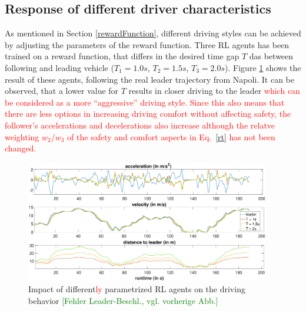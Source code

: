 \documentclass[review]{elsarticle}
\providecommand{\red}[1]{\textcolor{red}{#1}}
\providecommand{\green}[1]{\textcolor{green}{#1}}
\providecommand{\martin}[1]{\red{#1}} %
\providecommand{\martinc}[1]{\green{[#1]}} %
\providecommand{\3}{{\ss}}
\begin{document}
\subsection{Response of different driver characteristics}
\label{sec:differentT}

As mentioned in Section \ref{rewardFunction}, different driving styles
can be achieved by adjusting the parameters of the reward
function. Three RL agents has been trained on a reward function, that
differs in the desired time gap $T$ das between following and
leading vehicle ($T_{1} = 1.0s$, $T_{2} = 1.5s$, $T_{3} =
2.0s$). Figure \ref{fig:differentT} shows the result of these agents,
following the real leader trajectory from Napoli. It can be observed,
that a lower value for $T$ results in closer driving to the
leader \martin{which can be considered as a more ``aggressive''
  driving style. Since this also means that there are less options in
increasing driving comfort without affecting safety, the follower's
accelerations and decelerations also increase although the relatve
weighting $w_2/w_3$ of the safety and comfort aspects in Eq.~\eqref{rt} has not been
changed.} 

\begin{figure}
	\centering
	\includegraphics[width=0.95\textwidth]{images/differentT}
	\caption{Impact of different\martin{ly} parametrized RL agents
          on the driving behavior \martinc{Fehler Leader-Beschl., vgl. vorherige Abb.}}
	\label{fig:differentT}
\end{figure}
\end{document}
